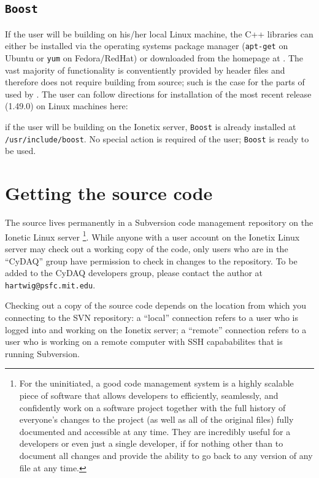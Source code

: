 \subsection{\texttt{Boost}}
If the user will be building \ADAQ on his/her local Linux machine, the
\BOOST C++ libraries can either be installed via the operating systems
package manager (\texttt{apt-get} on Ubuntu or \texttt{yum} on
Fedora/RedHat) or downloaded from the \BOOST homepage at
. The vast majority of \BOOST
functionality is conventiently provided by header files and therefore
does not require building from source; such is the case for the parts
of \BOOST used by \ADAQ. The user can follow directions for installation
of the most recent \BOOST release (1.49.0) on Linux machines here:

if the user will be building \ADAQ on the Ionetix server, \texttt{Boost}
is already installed at \texttt{/usr/include/boost}. No special action
is required of the user; \texttt{Boost} is ready to be used.


\section{Getting the \ADAQ source code}
\label{sec:sourcecode}
The \ADAQ source lives permanently in a Subversion code management
repository on the Ionetic Linux server \footnote{For the uninitiated,
  a good code management system is a highly scalable piece of software
  that allows developers to efficiently, seamlessly, and confidently
  work on a software project together with the full history of
  everyone's changes to the project (as well as all of the original
  files) fully documented and accessible at any time. They are
  incredibly useful for a developers or even just a single developer,
  if for nothing other than to document all changes and provide the
  ability to go back to any version of any file at any time.}. While
anyone with a user account on the Ionetix Linux server may check out a
working copy of the code, only users who are in the ``CyDAQ'' group
have permission to check in changes to the repository. To be added to
the CyDAQ developers group, please contact the author at
\texttt{hartwig@psfc.mit.edu}.

Checking out a copy of the source code depends on the location from
which you connecting to the SVN repository: a ``local'' connection
refers to a user who is logged into and working on the Ionetix server;
a ``remote'' connection refers to a user who is working on a remote
computer with SSH capababilites that is running Subversion.\\

